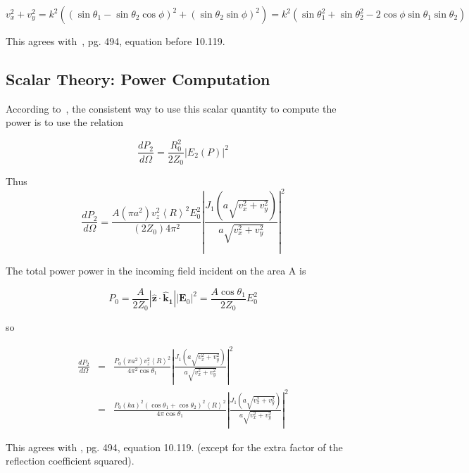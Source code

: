 \documentclass[11pt]{article}
\newcommand{\der}[2]{\frac{d {#1}}{d {#2}}}
\newcommand{\bm}[1]{\mathbf{#1}}
\begin{document}
{{{{  \begin{equation}
v_{x}^{2}+v_{y}^{2}=k^{2}\left((\sin\theta_{1}-
\sin\theta_{2}\cos{\phi})^2+(\sin\theta_{2}\sin\phi)^{2}\right)=k^{2}
\left(\sin\theta_{1}^{2}+\sin\theta_{2}^{2}-2\cos\phi\sin\theta_{1}\sin\theta_{2}\right)
  \end{equation}

This agrees with~\cite{b:jackson}, pg. 494, equation before 10.119.  

\subsection{Scalar Theory: Power Computation}

According to~\cite{b:jackson}, the consistent way to use this scalar
quantity to compute the power is to use the relation

  \begin{equation}
\der{P_{2}}{\Omega}=\frac{R_{0}^{2}}{2Z_{0}}|E_{2}(P)|^{2}
  \end{equation}

Thus
  \begin{equation}
\der{P_{2}}{\Omega}=\frac{A(\pi a^{2})v_{z}^{2}\left<R\right>^{2}E_{0}^{2}}{(2Z_{0})4\pi^{2}}\left|\frac{J_{1}(a\sqrt{v_{x}^{2}+v_{y}^{2}})}{a\sqrt{v_{x}^{2}+v_{y}^{2}}}\right|^{2}
  \end{equation}

The total power power in the incoming field incident on the area A is

  \begin{equation}
P_{0}=\frac{A}{2Z_{0}}|\bm{\hat z}\cdot\bm{\hat k_{1}}||\bm E_{0}|^{2}=\frac{A\cos\theta_{1}}{2Z_{0}}E_{0}^{2}
  \end{equation}

so

\begin{eqnarray}
\der{P_{2}}{\Omega}&=&\frac{P_{0}(\pi a^{2})v_{z}^{2}\left<R\right>^{2}}{4\pi^{2}\cos\theta_{1}}\left|\frac{J_{1}(a\sqrt{v_{x}^{2}+v_{y}^{2}})}{a\sqrt{v_{x}^{2}+v_{y}^{2}}}\right|^{2}\\
&=&\frac{P_{0}(ka)^{2}(\cos\theta_{1}+\cos\theta_{2})^{2}\left<R\right>^{2}}{4\pi\cos\theta_{1}}\left|\frac{J_{1}(a\sqrt{v_{x}^{2}+v_{y}^{2}})}{a\sqrt{v_{x}^{2}+v_{y}^{2}}}\right|^{2}
\end{eqnarray}

This agrees with \cite{b:jackson}, pg. 494, equation 10.119.  (except
for the extra factor of the reflection coefficient squared).

}}}}
\end{document}
